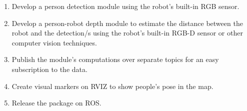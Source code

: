 \begin{enumerate}
  \item Develop a person detection module using the robot's built-in RGB sensor.
  \item Develop a person-robot depth module to estimate the distance between the robot and the detection/s using the robot's built-in RGB-D sensor or other computer vision techniques.
  \item Publish the module's computations over separate topics for an easy subscription to the data.
  \item Create visual markers on RVIZ to show people's pose in the map.
  \item Release the package on ROS.
\end{enumerate}